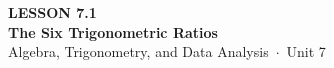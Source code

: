 \documentclass[aspectratio=169, 11pt]{beamer}
\begin{document}
{
\begin{frame}[plain]
  \vspace{2.8cm}\hspace{0.55cm}%
  \begin{minipage}{0.9\textwidth}
    {\color{goldacc}\bfseries\small LESSON 7.1}\\[0.5cm]
    {\color{white}\bfseries\LARGE The Six Trigonometric Ratios}\\[1.2cm]
    {\color{mistmid}\small Algebra, Trigonometry, and Data Analysis~$\cdot$~Unit 7}
  \end{minipage}
\end{frame}
}

\begin{frame}[t, plain]
\end{frame}
\end{document}

